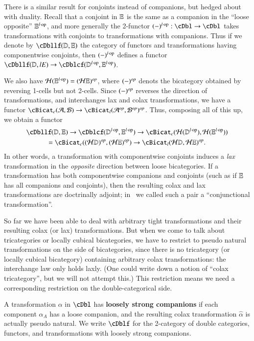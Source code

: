 \begin{rmk}
  There is a similar result for conjoints instead of companions, but hedged about with duality.
  Recall that a conjoint in $\mathbb{E}$ is the same as a companion in the ``loose opposite'' $\mathbb{E}^{l\cdot\mathrm{op}}$, and more generally the 2-functor $(-)\lop:\cDbl \to \cDbl$ takes transformations with conjoints to transformations with companions.
  Thus if we denote by $\cDbllf(\lD,\lE)$ the category of functors and transformations having componentwise conjoints, then $(-)^{l\cdot\mathrm{op}}$ defines a functor $\cDbllf(\lD,lE) \to \cDblcf(\lD\lop,\lE\lop)$.

  We also have $\mathcal{H}(\mathbb{E}^{l\cdot\mathrm{op}}) = (\mathcal{H}\mathbb{E})^{\mathit{op}}$, where $(-)^{\mathit{op}}$ denots the bicategory obtained by reversing 1-cells but not 2-cells.
  Since $(-)^{\mathit{op}}$ reverses the direction of transformations, and interchanges lax and colax transformations, we have a functor $\cBicat_c(\cA,\cB) \to \cBicat_l(\cA\op,\cB\op)\op$.
  Thus, composing all of this up, we obtain a functor
  \begin{multline*}
    \cDbllf(\lD,\lE) \to \cDblcf(\lD\lop,\lE\lop) \to \cBicat_c(\cH(\lD\lop),\cH(\lE\lop))\\ = \cBicat_c((\cH\lD)\op, (\cH\lE)\op) \to \cBicat_l(\cH\lD, \cH\lE)\op.
  \end{multline*}
  In other words, a transformation with componentwise conjoints induces a \emph{lax} transformation in the \emph{opposite} direction between loose bicategories.
  If a transformation has both componentwise companions and conjoints (such as if $\mathbb{E}$ has all companions and conjoints), then the resulting colax and lax transformations are doctrinally adjoint; in~\cite{shulman:smbicat} we called such a pair a ``conjunctional transformation''.
\end{rmk}

So far we have been able to deal with arbitrary tight transformations and their resulting colax (or lax) transformations.
But when we come to talk about tricategories or locally cubical bicategories, we have to restrict to pseudo natural transformations on the side of bicategories, since there is no tricategory (or locally cubical bicategory) containing arbitrary colax transformations: the interchange law only holds laxly.
(One could write down a notion of ``colax tricategory'', but we will not attempt this.)
This restriction means we need a corresponding restriction on the double-categorical side.


\begin{defn}
  A transformation $\alpha$ in $\cDbl$ has \textbf{loosely strong companions} if each component $\alpha_A$ has a loose companion, and the resulting colax transformation $\hat\alpha$ is actually pseudo natural.
  We write $\cDblf$ for the 2-category of double categories, functors, and transformations with loosely strong companions.
\end{defn}

